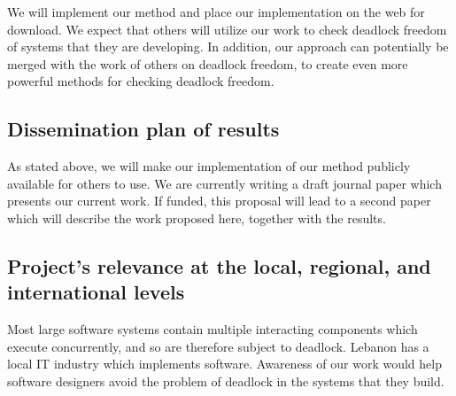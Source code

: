 We will implement our method and place our implementation on the web
for download. We expect that others will utilize our work to check deadlock
freedom of systems that they are developing. In addition, our approach can
potentially be merged with the work of others \cite{AGR16} on deadlock freedom, to create
even more powerful methods for checking deadlock freedom.



\subsection{Dissemination plan of results}

As stated above, we will make our implementation of our method publicly
available for others to use. We are currently writing a draft journal paper
which presents our current work. If funded, this proposal will lead to a second
paper which will describe the work proposed here, together with the results.


\subsection{Project's relevance at the local, regional, and international levels}

Most large software systems contain multiple interacting components which
execute concurrently, and so are therefore subject to deadlock. Lebanon has a
local IT industry which implements software. Awareness of our work would help
software designers avoid the problem of deadlock in the systems that they build.

